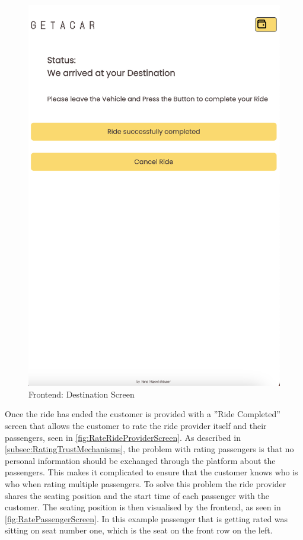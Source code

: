 \begin{figure}[H]
\begin{minipage}{0.45\linewidth}
        \includegraphics[width=\linewidth]{data/ffss/10.png}
        \caption{Frontend: Destination Screen}
        \label{fig:DestinationScreen}
    \end{minipage}
    
\end{figure}

Once the ride has ended the customer is provided with a ''Ride Completed'' screen that allows the customer to rate the ride provider itself and their passengers, seen in \ref{fig:RateRideProviderScreen}. As described in \ref{subsec:RatingTrustMechanisms}, the problem with rating passengers is that no personal information should be exchanged through the platform about the passengers. This makes it complicated to ensure that the customer knows who is who when rating multiple passengers. To solve this problem the ride provider shares the seating position and the start time of each passenger with the customer. The seating position is then visualised by the frontend, as seen in \ref{fig:RatePassengerScreen}. In this example passenger that is getting rated was sitting on seat number one, which is the seat on the front row on the left. 



